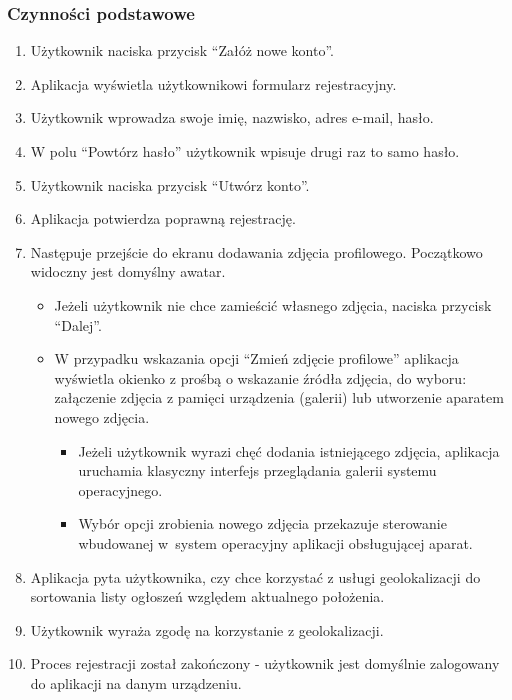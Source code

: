 \documentclass[licencjacka]{pracamgr}
\begin{document}
    \subsubsection{Czynności podstawowe}
    \begin{enumerate}
        \item Użytkownik naciska przycisk ``Załóż nowe konto''.
        \item Aplikacja wyświetla użytkownikowi formularz rejestracyjny.
        \item Użytkownik wprowadza swoje imię, nazwisko, adres e-mail, hasło.
        \item W polu ``Powtórz hasło'' użytkownik wpisuje drugi raz to samo hasło.
        \item Użytkownik naciska przycisk ``Utwórz konto''.
        \item Aplikacja potwierdza poprawną rejestrację.
        \item Następuje przejście do ekranu dodawania zdjęcia profilowego. Początkowo widoczny jest domyślny awatar.
            \begin{itemize}
                \item Jeżeli użytkownik nie chce zamieścić własnego zdjęcia, naciska przycisk ``Dalej''.
                \item W przypadku wskazania opcji ``Zmień zdjęcie profilowe'' aplikacja wyświetla okienko z prośbą o wskazanie źródła zdjęcia, do wyboru: załączenie zdjęcia z pamięci urządzenia (galerii) lub utworzenie aparatem nowego zdjęcia.
                    \begin{itemize}
                        \item Jeżeli użytkownik wyrazi chęć dodania istniejącego zdjęcia, aplikacja uruchamia klasyczny interfejs przeglądania galerii systemu operacyjnego.
                        \item Wybór opcji zrobienia nowego zdjęcia przekazuje sterowanie wbudowanej w~system operacyjny aplikacji obsługującej aparat.
                    \end{itemize}
            \end{itemize}
     \item Aplikacja pyta użytkownika, czy chce korzystać z usługi geolokalizacji do sortowania listy ogłoszeń względem aktualnego położenia.
     \item Użytkownik wyraża zgodę na korzystanie z geolokalizacji.
     \item Proces rejestracji został zakończony - użytkownik jest domyślnie zalogowany do aplikacji na danym urządzeniu.
    \end{enumerate}
\end{document}
